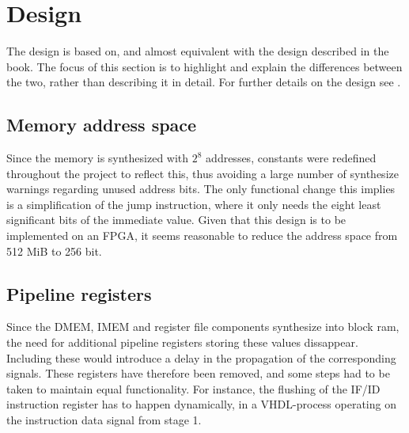 \section{Design}
The design is based on, and almost equivalent with the design described in the
book. The focus of this section is to highlight and explain the differences
between the two, rather than describing it in detail. For further details on the
design see \cite{patterson12}.
\subsection{Memory address space}
Since the memory is synthesized with $2^8$ addresses, constants were redefined
throughout the project to reflect this, thus avoiding a large number of
synthesize warnings regarding unused address bits. The only functional change
this implies is a simplification of the jump instruction, where it only needs
the eight least significant bits of the immediate value. Given that this design
is to be implemented on an FPGA, it seems reasonable to reduce the address
space from 512 MiB to 256 bit.

\subsection{Pipeline registers}
Since the DMEM, IMEM and register file components synthesize into block ram, the
need for additional pipeline registers storing these values dissappear.
Including these would introduce a delay in the propagation of the corresponding
signals. These registers have therefore been removed, and some steps had to be
taken to maintain equal functionality. For instance, the flushing of the IF/ID
instruction register has to happen dynamically, in a VHDL-process operating on
the instruction data signal from stage 1.
